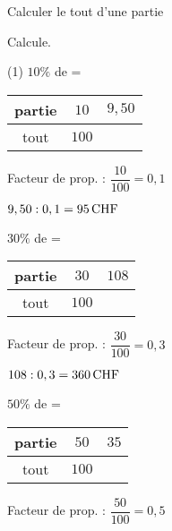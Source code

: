 \documentclass[a4paper,11pt]{report}
\begin{document}
\begin{resolu}{Calculer le tout d'une partie}{
    Calcule.
    \begin{tasks}(1)
    \task $10\%$ de  = 
    
        \begin{minipage}[]{0.3\textwidth}
         \begin{tabular}{|c|c|c|}
             \hline
             partie & $10$ & $9,50$ \\ \hline
             tout & $100$ &  \\ \hline
         \end{tabular}
         \end{minipage}
         \begin{minipage}[]{0.7\textwidth}
         Facteur de prop. : $\dfrac{10}{100}=0,1$
         
            $9,50 : 0,1 =\tunit{95}{CHF}$
         \end{minipage}
     
    \task $30\%$ de  = 
    
        \begin{minipage}[]{0.3\textwidth}
         \begin{tabular}{|c|c|c|}
             \hline
             partie & $30$ & $108$ \\ \hline
             tout & $100$ &  \\ \hline
         \end{tabular}
         \end{minipage}
         \begin{minipage}[]{0.7\textwidth}
         Facteur de prop. : $\dfrac{30}{100}=0,3$
         
            $108 : 0,3=\tunit{360}{CHF}$
         \end{minipage}
     
    \task $50\%$ de  = 
    
        \begin{minipage}[]{0.3\textwidth}
         \begin{tabular}{|c|c|c|}
             \hline
             partie & $50$ & $35$ \\ \hline
             tout & $100$ &  \\ \hline
         \end{tabular}
         \end{minipage}
         \begin{minipage}[]{0.7\textwidth}
         Facteur de prop. : $\dfrac{50}{100}=0,5$
         

\end{minipage}
\end{tasks}}
\end{resolu}
\end{document}
